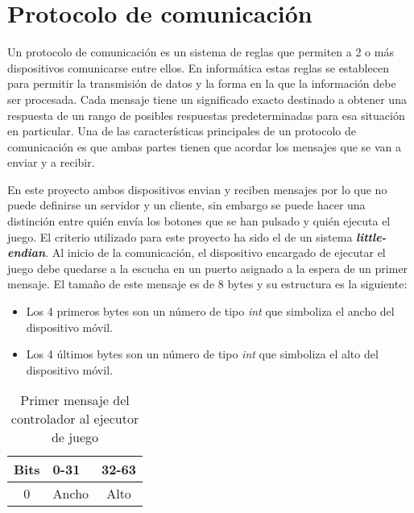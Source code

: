 \section{Protocolo de comunicaci\'on}

Un protocolo de comunicaci\'on es un sistema de reglas que permiten a 2 o m\'as dispositivos comunicarse entre ellos. En inform\'atica estas reglas se establecen para permitir la transmisi\'on de datos y la forma en la que la informaci\'on debe ser procesada. Cada mensaje tiene un significado exacto destinado a obtener una respuesta de un rango de posibles respuestas predeterminadas para esa situaci\'on en particular. Una de las caracter\'isticas principales de un protocolo de comunicaci\'on es que ambas partes tienen que acordar los mensajes que se van a enviar y a recibir. 

En este proyecto ambos dispositivos envian y reciben mensajes por lo que no puede definirse un servidor y un cliente, sin embargo se puede hacer una distinci\'on entre qui\'en env\'ia los botones que se han pulsado y qui\'en ejecuta el juego. El criterio utilizado para este proyecto ha sido el de un sistema \textbf{\textit{little-endian}}. Al inicio de la comunicaci\'on, el dispositivo encargado de ejecutar el juego debe quedarse a la escucha en un puerto asignado a la espera de un primer mensaje. El tama\~no de este mensaje es de 8 bytes y su estructura es la siguiente:

\begin {itemize}
\item Los 4 primeros bytes son un n\'umero de tipo \textit{int} que simboliza el ancho del dispositivo m\'ovil.
\item Los 4 \'ultimos bytes son un n\'umero de tipo \textit{int} que simboliza el alto del dispositivo m\'ovil.
\end {itemize}

\begin{table}[h!]
\centering
\begin{tabular}{|l|l|l|} 
\hline
Bits                    & 0-31                   & 32-63                   \\
\hline
\multicolumn{1}{|c|}{0} & \multicolumn{1}{c|}{Ancho} & \multicolumn{1}{c|}{Alto}  \\
\hline
\end{tabular}
\caption{Primer mensaje del controlador al ejecutor de juego}
\label{table:2}
\end{table}


